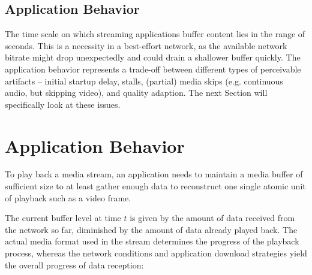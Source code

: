 
\subsection{Application Behavior}

The time scale on which streaming applications buffer content lies in the range of seconds. This is a necessity in a best-effort network, as the available network bitrate might drop unexpectedly and could drain a shallower buffer quickly. %
The application behavior represents a trade-off between different types of perceivable artifacts -- initial startup delay, stalls, (partial) media skips (e.g. continuous audio, but skipping video), and quality adaption. The next Section will specifically look at these issues.




\section{Application Behavior}
\label{sec:appbehavior}

%

To play back a media stream, an application needs to maintain a media buffer of sufficient size to at least gather enough data to reconstruct one single atomic unit of playback such as a video frame.

The current buffer level at time $t$ is given by the amount of data received from the network so far, diminished by the amount of data already played back. The actual media format used in the stream determines the progress of the playback process, whereas the network conditions and application download strategies yield the overall progress of data reception:

